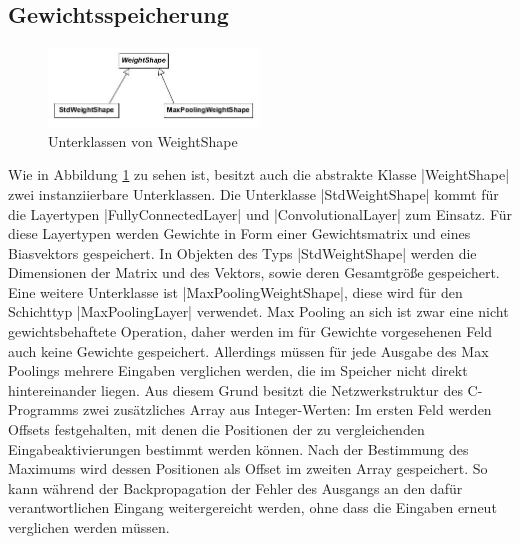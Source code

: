\documentclass[../main.tex]{subfiles}
\begin{document}
\subsection{Gewichtsspeicherung} \label{xeonphi:netdesc_weights}
\begin{figure}
	\centering 
	\includegraphics[width=0.5\textwidth]{../images/Schmidt/cd_netdesc_weightshapes.jpg} 
	\caption {Unterklassen von WeightShape}
	\label{pic:cd_Netdesc_weightshapes} 
\end{figure} 
Wie in Abbildung \ref{pic:cd_Netdesc_weightshapes} zu sehen ist, besitzt auch die abstrakte Klasse |WeightShape| zwei instanziierbare Unterklassen. Die Unterklasse |StdWeightShape| kommt für die Layertypen |FullyConnectedLayer| und |ConvolutionalLayer| zum Einsatz. Für diese Layertypen werden Gewichte in Form einer Gewichtsmatrix und eines Biasvektors gespeichert. In Objekten des Typs |StdWeightShape| werden die Dimensionen der Matrix und des Vektors, sowie deren Gesamtgröße gespeichert. Eine weitere Unterklasse ist |MaxPoolingWeightShape|, diese wird für den Schichttyp |MaxPoolingLayer| verwendet. Max Pooling an sich ist zwar eine nicht gewichtsbehaftete Operation, daher werden im für Gewichte vorgesehenen Feld auch keine Gewichte gespeichert. Allerdings müssen für jede Ausgabe des Max Poolings mehrere Eingaben verglichen werden, die im Speicher nicht direkt hintereinander liegen. Aus diesem Grund besitzt die Netzwerkstruktur des C-Programms zwei zusätzliches Array aus Integer-Werten: Im ersten Feld werden Offsets festgehalten, mit denen die Positionen der zu vergleichenden Eingabeaktivierungen bestimmt werden können. Nach der Bestimmung des Maximums wird dessen Positionen als Offset im zweiten Array gespeichert. So kann während der Backpropagation der Fehler des Ausgangs an den dafür verantwortlichen Eingang weitergereicht werden, ohne dass die Eingaben erneut verglichen werden müssen. 
\end{document}
